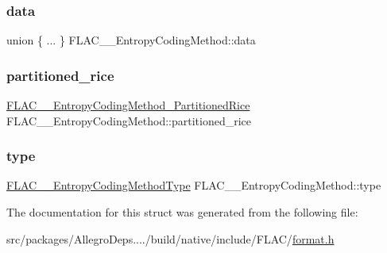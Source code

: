 \subsubsection{\texorpdfstring{data}{data}}
{\footnotesize\ttfamily union \{ ... \}   F\+L\+A\+C\+\_\+\+\_\+\+Entropy\+Coding\+Method\+::data}

\mbox{\label{struct_f_l_a_c_____entropy_coding_method_a41d493a19d5c01ec7a06a5b3d83adf8b}} 
\subsubsection{\texorpdfstring{partitioned\+\_\+rice}{partitioned\_rice}}
{\footnotesize\ttfamily \hyperlink{struct_f_l_a_c_____entropy_coding_method___partitioned_rice}{F\+L\+A\+C\+\_\+\+\_\+\+Entropy\+Coding\+Method\+\_\+\+Partitioned\+Rice} F\+L\+A\+C\+\_\+\+\_\+\+Entropy\+Coding\+Method\+::partitioned\+\_\+rice}

\mbox{\label{struct_f_l_a_c_____entropy_coding_method_abe41e84858fd130777b7cc3c27e400f8}} 
\subsubsection{\texorpdfstring{type}{type}}
{\footnotesize\ttfamily \hyperlink{group__flac__format_ga951733d2ea01943514290012cd622d3a}{F\+L\+A\+C\+\_\+\+\_\+\+Entropy\+Coding\+Method\+Type} F\+L\+A\+C\+\_\+\+\_\+\+Entropy\+Coding\+Method\+::type}



The documentation for this struct was generated from the following file\+:\begin{DoxyCompactItemize}
\item 
src/packages/\+Allegro\+Deps..../build/native/include/\+F\+L\+A\+C/\hyperlink{format_8h}{format.\+h}\end{DoxyCompactItemize}
